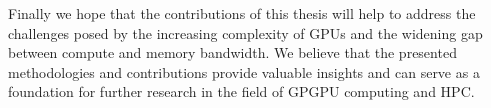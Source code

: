 Finally we hope that the contributions of this thesis will help to address the challenges posed by the increasing complexity of GPUs and the widening gap between compute and memory bandwidth. We believe that the presented methodologies and contributions provide valuable insights and can serve as a foundation for further research in the field of GPGPU computing and HPC.

